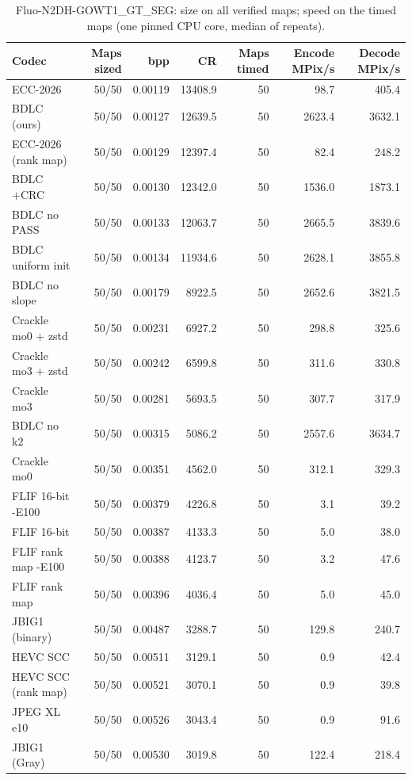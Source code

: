 \begin{table}[t]
\centering
\caption{Fluo-N2DH-GOWT1\_GT\_SEG: size on all verified maps; speed on the timed maps (one pinned CPU core, median of repeats).}
\begin{tabular}{lrrrrrr}
\hline
Codec & Maps sized & bpp & CR & Maps timed & Encode MPix/s & Decode MPix/s \\
\hline
ECC-2026 & 50/50 & 0.00119 & 13408.9 & 50 & 98.7 & 405.4 \\
BDLC (ours) & 50/50 & 0.00127 & 12639.5 & 50 & 2623.4 & 3632.1 \\
ECC-2026 (rank map) & 50/50 & 0.00129 & 12397.4 & 50 & 82.4 & 248.2 \\
BDLC +CRC & 50/50 & 0.00130 & 12342.0 & 50 & 1536.0 & 1873.1 \\
BDLC no PASS & 50/50 & 0.00133 & 12063.7 & 50 & 2665.5 & 3839.6 \\
BDLC uniform init & 50/50 & 0.00134 & 11934.6 & 50 & 2628.1 & 3855.8 \\
BDLC no slope & 50/50 & 0.00179 & 8922.5 & 50 & 2652.6 & 3821.5 \\
Crackle mo0 + zstd & 50/50 & 0.00231 & 6927.2 & 50 & 298.8 & 325.6 \\
Crackle mo3 + zstd & 50/50 & 0.00242 & 6599.8 & 50 & 311.6 & 330.8 \\
Crackle mo3 & 50/50 & 0.00281 & 5693.5 & 50 & 307.7 & 317.9 \\
BDLC no k2 & 50/50 & 0.00315 & 5086.2 & 50 & 2557.6 & 3634.7 \\
Crackle mo0 & 50/50 & 0.00351 & 4562.0 & 50 & 312.1 & 329.3 \\
FLIF 16-bit -E100 & 50/50 & 0.00379 & 4226.8 & 50 & 3.1 & 39.2 \\
FLIF 16-bit & 50/50 & 0.00387 & 4133.3 & 50 & 5.0 & 38.0 \\
FLIF rank map -E100 & 50/50 & 0.00388 & 4123.7 & 50 & 3.2 & 47.6 \\
FLIF rank map & 50/50 & 0.00396 & 4036.4 & 50 & 5.0 & 45.0 \\
JBIG1 (binary) & 50/50 & 0.00487 & 3288.7 & 50 & 129.8 & 240.7 \\
HEVC SCC & 50/50 & 0.00511 & 3129.1 & 50 & 0.9 & 42.4 \\
HEVC SCC (rank map) & 50/50 & 0.00521 & 3070.1 & 50 & 0.9 & 39.8 \\
JPEG XL e10 & 50/50 & 0.00526 & 3043.4 & 50 & 0.9 & 91.6 \\
JBIG1 (Gray) & 50/50 & 0.00530 & 3019.8 & 50 & 122.4 & 218.4 \\

\end{tabular}
\end{table}

